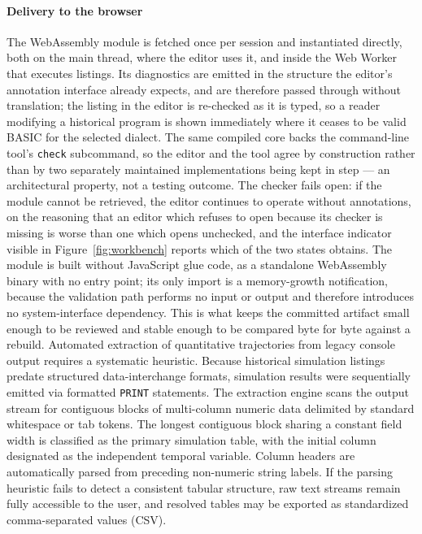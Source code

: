 \documentclass[3p,times,authoryear,twocolumn]{elsarticle}
\begin{document}

\paragraph{Delivery to the browser} The WebAssembly module is fetched once per session and instantiated directly, both on the main thread, where the editor uses it, and inside the Web Worker that executes listings. Its diagnostics are emitted in the structure the editor's annotation interface already expects, and are therefore passed through without translation; the listing in the editor is re-checked as it is typed, so a reader modifying a historical program is shown immediately where it ceases to be valid BASIC for the selected dialect. The same compiled core backs the command-line tool's \texttt{check} subcommand, so the editor and the tool agree by construction rather than by two separately maintained implementations being kept in step --- an architectural property, not a testing outcome. The checker fails open: if the module cannot be retrieved, the editor continues to operate without annotations, on the reasoning that an editor which refuses to open because its checker is missing is worse than one which opens unchecked, and the interface indicator visible in Figure~\ref{fig:workbench} reports which of the two states obtains. The module is built without JavaScript glue code, as a standalone WebAssembly binary with no entry point; its only import is a memory-growth notification, because the validation path performs no input or output and therefore introduces no system-interface dependency. This is what keeps the committed artifact small enough to be reviewed and stable enough to be compared byte for byte against a rebuild.
Automated extraction of quantitative trajectories from legacy console output requires a systematic heuristic. Because historical simulation listings predate structured data-interchange formats, simulation results were sequentially emitted via formatted \texttt{PRINT} statements. The extraction engine scans the output stream for contiguous blocks of multi-column numeric data delimited by standard whitespace or tab tokens. The longest contiguous block sharing a constant field width is classified as the primary simulation table, with the initial column designated as the independent temporal variable. Column headers are automatically parsed from preceding non-numeric string labels. If the parsing heuristic fails to detect a consistent tabular structure, raw text streams remain fully accessible to the user, and resolved tables may be exported as standardized comma-separated values (CSV).
\end{document}
